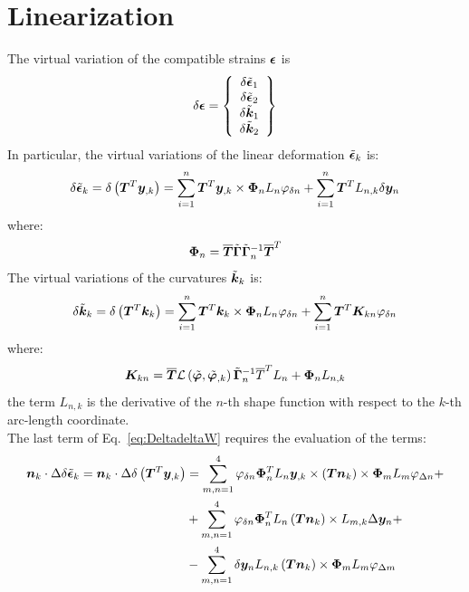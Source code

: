 \section{Linearization}
The virtual variation of the compatible strains $\T{\epsilon}$ is
\begin{equation}
\delta \T{\epsilon} =
\cubr{\vvect{c}{
\delta \tilde{\T{\epsilon} }_1 \\
\delta \tilde{\T{\epsilon} }_2 \\
\delta \tilde{\T{k} }_1 \\
\delta \tilde{\T{k} }_2 \\
}}
\end{equation}
In particular, the virtual variations of the linear deformation $\tilde{\T{\epsilon} }_k $ is:
\begin{equation}
\delta \tilde{\T{\epsilon} }_k  = \delta \plbr{ \T{T}^T \T{y}_{,k} } =
\sum_{i=1}^n \T{T}^T \T{y}_{,k} \times \T{\Phi}_{n} L_n \varphi_{\delta n} + \sum_{i=1}^n \T{T}^T L_{n,k} \delta \T{y}_{n}
\label{eq:delta_epsilon}
\end{equation}
where:
\begin{equation}
\T{\Phi}_{n} = \overline{\T{T}}  \tilde{ \T{\Gamma} } \tilde{ \T{\Gamma} }_n^{-1} \overline{\T{T}}^T
\end{equation}
The  virtual variations of the curvatures $\tilde{\T{k} }_k$ is:
\begin{equation}
\delta \tilde{\T{k} }_k = \delta \plbr{ \T{T}^T \T{k}_k } =
\sum_{i=1}^n \T{T}^T \T{k}_k \times \T{\Phi}_n L_n \varphi_{\delta n} + \sum_{i=1}^n \T{T}^T \T{K}_{kn} \varphi_{\delta n}
\label{eq:delta_k}
\end{equation}
where:
\begin{equation}
\T{K}_{kn} = \overline{\T{T}} \mathcal{L} \plbr{ \tilde{\T{\varphi}}, \tilde{\T{\varphi}}_{,k} } \tilde{ \T{\Gamma} }_{n}^{-1} \overline{T}^T L_n + \T{\Phi}_{n} L_{n,k}
\end{equation}
the term $L_{n,k}$ is the derivative of the $n$-th shape function with respect to the $k$-th arc-length coordinate.\\
The last term of Eq.~\ref{eq:DeltadeltaW} requires the evaluation of the terms:
\begin{equation}
\begin{split}
\T{n}_k \cdot \Delta \delta \tilde{\T{\epsilon}}_k =
\T{n}_k \cdot \Delta \delta \plbr{ \T{T}^T \T{y}_{,k} } & =
\sum_{m,n=1}^{4} \varphi_{\delta n} \T{\Phi}_{n}^T L_n \T{y}_{,k} \times \plbr{ \T{T} \T{n}_k } \times \T{\Phi}_m L_m  \varphi_{\Delta n} + \\
& + \sum_{m,n=1}^{4} \varphi_{\delta n} \T{\Phi}_{n}^T L_n \plbr{\T{T} \T{n}_k} \times L_{m,k} \Delta \T{y}_{n} + \\
& - \sum_{m,n=1}^{4} \delta \T{y}_n L_{n,k} \plbr{\T{T} \T{n}_k} \times \T{\Phi}_m L_m \varphi_{\Delta m}
\end{split}
\label{eq:Deltadelta_epsilon}
\end{equation}
